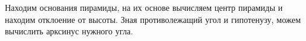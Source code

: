 \solutionSection

Находим основания пирамиды, на их основе вычисляем центр пирамиды и находим отклоение от высоты. 
Зная противолежащий угол и гипотенузу, можем вычислить арксинус нужного угла. 

\codeExample

